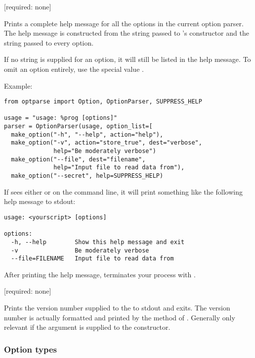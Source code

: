 \begin{definitions}
 [required: none]

Prints a complete help message for all the options in the current
option parser.  The help message is constructed from the 
string passed to 's constructor and the 
string passed to every option.

If no  string is supplied for an option, it will still be
listed in the help message.  To omit an option entirely, use the
special value .

Example:

\begin{verbatim}
from optparse import Option, OptionParser, SUPPRESS_HELP

usage = "usage: %prog [options]"
parser = OptionParser(usage, option_list=[
  make_option("-h", "--help", action="help"),
  make_option("-v", action="store_true", dest="verbose",
              help="Be moderately verbose")
  make_option("--file", dest="filename",
              help="Input file to read data from"),
  make_option("--secret", help=SUPPRESS_HELP)
\end{verbatim}

If  sees either  or
 on the command line, it will print something
like the following help message to stdout:

\begin{verbatim}
usage: <yourscript> [options]

options:
  -h, --help        Show this help message and exit
  -v                Be moderately verbose
  --file=FILENAME   Input file to read data from
\end{verbatim}

After printing the help message,  terminates your process
with .

 [required: none]

Prints the version number supplied to the  to
stdout and exits.  The version number is actually formatted and
printed by the  method of
.  Generally only relevant if the 
argument is supplied to the  constructor.
\end{definitions}

\subsubsection{Option types\label{optparse-option-types}}

